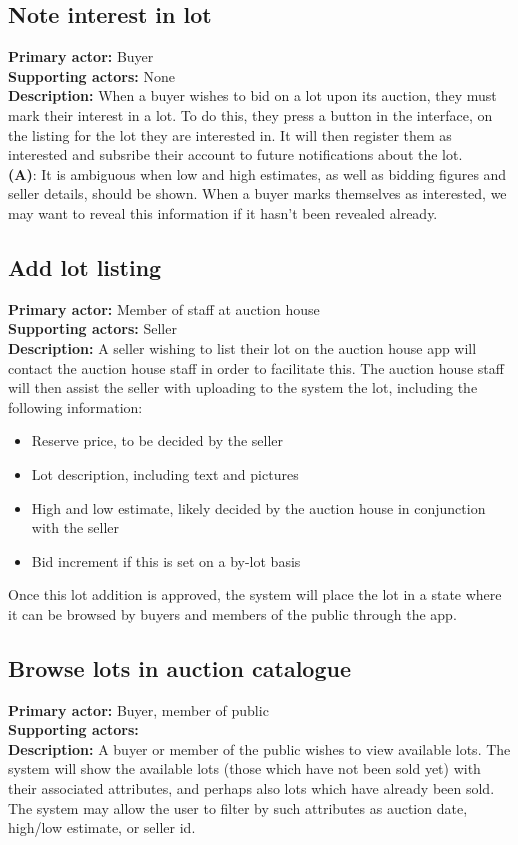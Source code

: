 \documentclass[titlepage, 12pt]{extarticle}
\begin{document}
\subsection{Note interest in lot}
{\bf Primary actor: } Buyer
\\{\bf Supporting actors: } None
\\{\bf Description: } When a buyer wishes to bid on a lot upon its auction, they must mark their interest in a lot. To do this, they press a button in the interface, on the listing for the lot they are interested in. It will then register them as interested and subsribe their account to future notifications about the lot.
\\{\bf (A)}: It is ambiguous when low and high estimates, as well as bidding figures and seller details, should be shown. When a buyer marks themselves as interested, we may want to reveal this information if it hasn't been revealed already.
\subsection{Add lot listing}
{\bf Primary actor: } Member of staff at auction house
\\{\bf Supporting actors: } Seller
\\{\bf Description: } A seller wishing to list their lot on the auction house app will contact the auction house staff in order to facilitate this. The auction house staff will then assist the seller with uploading to the system the lot, including the following information:
\begin{itemize}
\item Reserve price, to be decided by the seller
\item Lot description, including text and pictures
\item High and low estimate, likely decided by the auction house in conjunction with the seller
\item Bid increment if this is set on a by-lot basis
\end{itemize}

Once this lot addition is approved, the system will place the lot in a state where it can be browsed by buyers and members of the public through the app.

\subsection{Browse lots in auction catalogue}
{\bf Primary actor: } Buyer, member of public
\\{\bf Supporting actors: }
\\{\bf Description: } A buyer or member of the public wishes to view available lots. The system will show the available lots (those which have not been sold yet) with their associated attributes, and perhaps also lots which have already been sold. The system may allow the user to filter by such attributes as auction date, high/low estimate, or seller id. 
\end{document}
